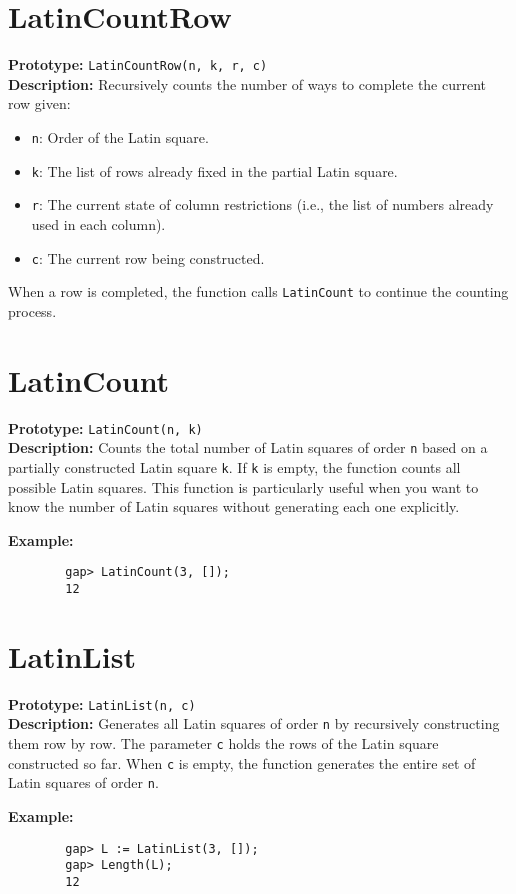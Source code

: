 \documentclass{report}
\begin{document}
	\section{LatinCountRow}
	\textbf{Prototype:} \texttt{LatinCountRow(n, k, r, c)}\\[1mm]
	\textbf{Description:}  
	Recursively counts the number of ways to complete the current row given:
	\begin{itemize}
		\item \texttt{n}: Order of the Latin square.
		\item \texttt{k}: The list of rows already fixed in the partial Latin square.
		\item \texttt{r}: The current state of column restrictions (i.e., the list of numbers already used in each column).
		\item \texttt{c}: The current row being constructed.
	\end{itemize}
	When a row is completed, the function calls \texttt{LatinCount} to continue the counting process.
	
	\section{LatinCount}
	\textbf{Prototype:} \texttt{LatinCount(n, k)}\\[1mm]
	\textbf{Description:}  
	Counts the total number of Latin squares of order \texttt{n} based on a partially constructed Latin square \texttt{k}. If \texttt{k} is empty, the function counts all possible Latin squares. This function is particularly useful when you want to know the number of Latin squares without generating each one explicitly.
	
	\textbf{Example:}
	\begin{lstlisting}
		gap> LatinCount(3, []);
		12
	\end{lstlisting}
	
	\section{LatinList}
	\textbf{Prototype:} \texttt{LatinList(n, c)}\\[1mm]
	\textbf{Description:}  
	Generates all Latin squares of order \texttt{n} by recursively constructing them row by row. The parameter \texttt{c} holds the rows of the Latin square constructed so far. When \texttt{c} is empty, the function generates the entire set of Latin squares of order \texttt{n}.
	
	\textbf{Example:}
	\begin{lstlisting}
		gap> L := LatinList(3, []);
		gap> Length(L);
		12
	\end{lstlisting}
	
\end{document}
